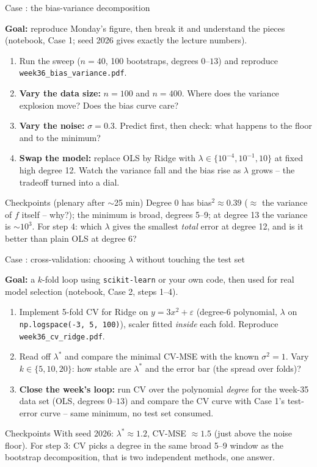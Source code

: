 \documentclass[10pt,aspectratio=169]{beamer}
\newcounter{case}
\newenvironment{case}[1][]{%
  \stepcounter{case}%
  \begin{frame}[fragile,environment=case]{Case \arabic{case}: #1}%
}{\end{frame}}
\begin{document}
\begin{case}[the bias-variance decomposition]
\textbf{Goal:} reproduce Monday's figure, then break it and understand the
pieces (notebook, Case 1; seed 2026 gives exactly the lecture numbers).
\begin{enumerate}
  \item Run the sweep ($n=40$, 100 bootstraps, degrees $0$--$13$) and
        reproduce \texttt{week36\_bias\_variance.pdf}.
  \item \textbf{Vary the data size:} $n=100$ and $n=400$.  Where does the
        variance explosion move?  Does the bias curve care?
  \item \textbf{Vary the noise:} $\sigma=0.3$.  Predict first, then check:
        what happens to the floor and to the minimum?
  \item \textbf{Swap the model:} replace OLS by Ridge with
        $\lambda\in\{10^{-4},10^{-1},10\}$ at fixed high degree 12.  Watch
        the variance fall and the bias rise as $\lambda$ grows -- the
        tradeoff turned into a dial.
\end{enumerate}
\vspace{2pt}
\begin{block}{Checkpoints (plenary after $\sim$25 min)}
Degree 0 has bias$^2\approx0.39$ ($\approx$ the variance of $f$ itself --
why?); the minimum is broad, degrees 5--9; at degree 13 the variance is
$\sim10^3$.  For step 4: which $\lambda$ gives the smallest \emph{total}
error at degree 12, and is it better than plain OLS at degree 6?
\end{block}
\end{case}

\begin{case}[cross-validation: choosing $\lambda$ without touching the test set]
\textbf{Goal:} a $k$-fold loop using \texttt{scikit-learn} or your own code, then used for real model selection (notebook, Case 2, steps 1--4).
\begin{enumerate}
  \item Implement 5-fold CV for Ridge on $y=3x^2+\varepsilon$ (degree-6
        polynomial, $\lambda$ on \texttt{np.logspace(-3, 5, 100)}), scaler
        fitted \emph{inside} each fold.  Reproduce
        \texttt{week36\_cv\_ridge.pdf}.
  \item Read off $\lambda^*$ and compare the minimal CV-MSE with the known
        $\sigma^2=1$.  Vary $k\in\{5,10,20\}$: how stable are $\lambda^*$ and
        the error bar (the spread over folds)?
  \item \textbf{Close the week's loop:} run CV over the polynomial
        \emph{degree} for the week-35 data set (OLS, degrees $0$--$13$) and
        compare the CV curve with Case 1's test-error curve -- same minimum,
        no test set consumed.
\end{enumerate}
\vspace{2pt}
\begin{block}{Checkpoints}
With seed 2026: $\lambda^*\approx1.2$, CV-MSE $\approx1.5$ (just above the
noise floor).  For step 3: CV picks a degree in the same broad 5--9 window as
the bootstrap decomposition, that is two independent methods, one answer.
\end{block}
\end{case}
\end{document}

